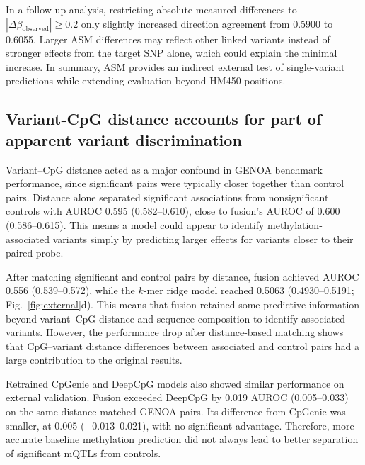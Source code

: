 \documentclass[11pt,letterpaper]{article}
\begin{document}
In a follow-up analysis, restricting absolute measured differences to $|\Delta\beta_{\mathrm{observed}}|\geq0.2$ only slightly increased direction agreement from 0.5900 to 0.6055. Larger ASM differences may reflect other linked variants instead of stronger effects from the target SNP alone, which could explain the minimal increase. In summary, ASM provides an indirect external test of single-variant predictions while extending evaluation beyond HM450 positions.

\subsection{Variant-CpG distance accounts for part of apparent variant discrimination}
Variant--CpG distance acted as a major confound in GENOA benchmark performance, since significant pairs were typically closer together than control pairs. Distance alone separated significant associations from nonsignificant controls with AUROC 0.595 (0.582--0.610), close to fusion's AUROC of 0.600 (0.586--0.615).  This means a model could appear to identify methylation-associated variants simply by predicting larger effects for variants closer to their paired probe.

After matching significant and control pairs by distance, fusion achieved AUROC 0.556 (0.539--0.572), while the $k$-mer ridge model reached 0.5063 (0.4930--0.5191; Fig.~\ref{fig:external}d). This means that fusion retained some predictive information beyond variant--CpG distance and sequence composition to identify associated variants. However, the performance drop after distance-based matching shows that CpG--variant distance differences between associated and control pairs had a large contribution to the original results.

Retrained CpGenie and DeepCpG models also showed similar performance on external validation. Fusion exceeded DeepCpG by 0.019 AUROC (0.005--0.033) on the same distance-matched GENOA pairs. Its difference from CpGenie was smaller, at 0.005 ($-0.013$--0.021), with no significant advantage. Therefore, more accurate baseline methylation prediction did not always lead to better separation of significant mQTLs from controls.
\end{document}
